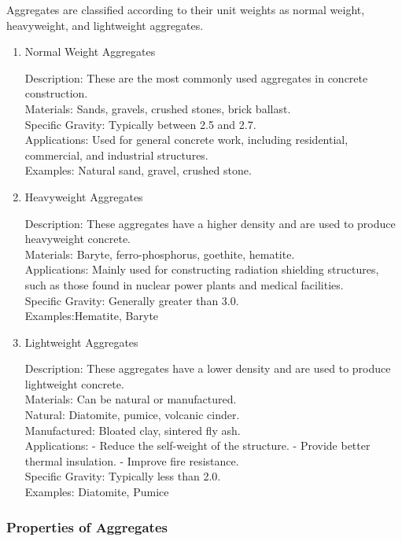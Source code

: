 \documentclass[a4paper,11pt]{book}
\begin{document}
Aggregates are classified according to their unit weights as normal weight, heavyweight, and lightweight aggregates.
\begin{enumerate}

\item Normal Weight Aggregates

Description: These are the most commonly used aggregates in concrete construction.
\\Materials: Sands, gravels, crushed stones, brick ballast.
\\Specific Gravity: Typically between 2.5 and 2.7.
\\Applications: Used for general concrete work, including residential, commercial, and industrial structures.
\\Examples: Natural sand, gravel, crushed stone.

\item Heavyweight Aggregates

Description: These aggregates have a higher density and are used to produce heavyweight concrete.
\\ Materials: Baryte, ferro-phosphorus, goethite, hematite.
\\ Applications: Mainly used for constructing radiation shielding structures, such as those found in nuclear power plants and medical facilities.
\\ Specific Gravity: Generally greater than 3.0.
\\ Examples:Hematite, Baryte
  
\item Lightweight Aggregates

Description: These aggregates have a lower density and are used to produce lightweight concrete.
\\ Materials: Can be natural or manufactured.
  \\ Natural: Diatomite, pumice, volcanic cinder.
  \\Manufactured: Bloated clay, sintered fly ash.
\\ Applications: 
  - Reduce the self-weight of the structure.
  - Provide better thermal insulation.
  - Improve fire resistance.
\\ Specific Gravity: Typically less than 2.0.
\\ Examples: Diatomite, Pumice

\end{enumerate}
\subsubsection{Properties of Aggregates}
\end{document}
